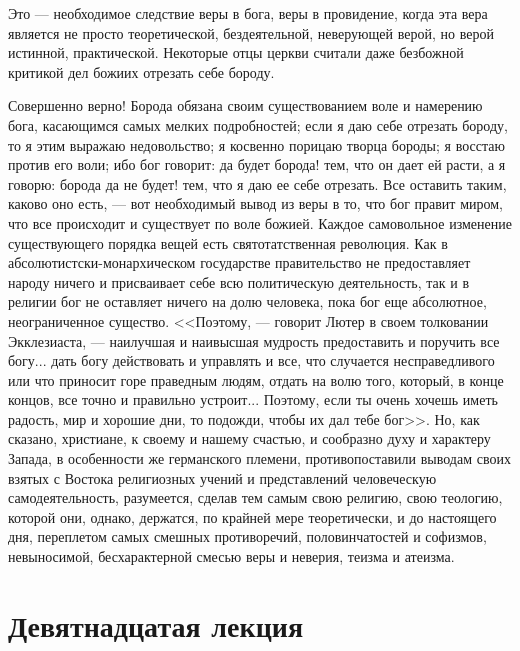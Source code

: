 \documentclass[12pt]{article}
\begin{document}
Это --- необходимое следствие веры в бога, веры в провидение, когда эта вера является не просто теоретической, бездеятельной, неверующей верой, но верой истинной, практической. Некоторые отцы церкви считали даже безбожной критикой дел божиих отрезать себе бороду. 

Совершенно верно! Борода обязана своим существованием воле и намерению бога, касающимся самых мелких подробностей; если я даю себе отрезать бороду, то я этим выражаю недовольство; я косвенно порицаю творца бороды; я восстаю против его воли; ибо бог говорит: да будет борода! тем, что он дает ей расти, а я говорю: борода да не будет! тем, что я даю ее себе отрезать. Все оставить таким, каково оно есть, --- вот необходимый вывод из веры в то, что бог правит миром, что все происходит и существует по воле божией. Каждое самовольное изменение существующего порядка вещей есть святотатственная революция. Как в абсолютистски-монархическом государстве правительство не предоставляет народу ничего и присваивает себе всю политическую деятельность, так и в религии бог не оставляет ничего на долю человека, пока бог еще абсолютное, неограниченное существо. <<Поэтому, --- говорит Лютер в своем толковании Экклезиаста, --- наилучшая и наивысшая мудрость предоставить и поручить все богу... дать богу действовать и управлять и все, что случается несправедливого или что приносит горе праведным людям, отдать на волю того, который, в конце концов, все точно и правильно устроит... Поэтому, если ты очень хочешь иметь радость, мир и хорошие дни, то подожди, чтобы их дал тебе бог>>. Но, как сказано, христиане, к своему и нашему счастью, и сообразно духу и характеру Запада, в особенности же германского племени, противопоставили выводам своих взятых с Востока религиозных учений и представлений человеческую самодеятельность, разумеется, сделав тем самым свою религию, свою теологию, которой они, однако, держатся, по крайней мере теоретически, и до настоящего дня, переплетом самых смешных противоречий, половинчатостей и софизмов, невыносимой, бесхарактерной смесью веры и неверия, теизма и атеизма. 

\section*{Девятнадцатая лекция}
\end{document}
